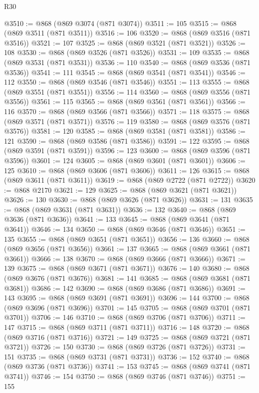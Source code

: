 \begin{lexlean}{R30}
\begin{coremodule}
@3510 := @868 (@869 @3074 (@871 @3074))
@3511 := 105
@3515 := @868 (@869 @3511 (@871 @3511))
@3516 := 106
@3520 := @868 (@869 @3516 (@871 @3516))
@3521 := 107
@3525 := @868 (@869 @3521 (@871 @3521))
@3526 := 108
@3530 := @868 (@869 @3526 (@871 @3526))
@3531 := 109
@3535 := @868 (@869 @3531 (@871 @3531))
@3536 := 110
@3540 := @868 (@869 @3536 (@871 @3536))
@3541 := 111
@3545 := @868 (@869 @3541 (@871 @3541))
@3546 := 112
@3550 := @868 (@869 @3546 (@871 @3546))
@3551 := 113
@3555 := @868 (@869 @3551 (@871 @3551))
@3556 := 114
@3560 := @868 (@869 @3556 (@871 @3556))
@3561 := 115
@3565 := @868 (@869 @3561 (@871 @3561))
@3566 := 116
@3570 := @868 (@869 @3566 (@871 @3566))
@3571 := 118
@3575 := @868 (@869 @3571 (@871 @3571))
@3576 := 119
@3580 := @868 (@869 @3576 (@871 @3576))
@3581 := 120
@3585 := @868 (@869 @3581 (@871 @3581))
@3586 := 121
@3590 := @868 (@869 @3586 (@871 @3586))
@3591 := 122
@3595 := @868 (@869 @3591 (@871 @3591))
@3596 := 123
@3600 := @868 (@869 @3596 (@871 @3596))
@3601 := 124
@3605 := @868 (@869 @3601 (@871 @3601))
@3606 := 125
@3610 := @868 (@869 @3606 (@871 @3606))
@3611 := 126
@3615 := @868 (@869 @3611 (@871 @3611))
@3619 := @868 (@869 @2722 (@871 @2722))
@3620 := @868 @2170
@3621 := 129
@3625 := @868 (@869 @3621 (@871 @3621))
@3626 := 130
@3630 := @868 (@869 @3626 (@871 @3626))
@3631 := 131
@3635 := @868 (@869 @3631 (@871 @3631))
@3636 := 132
@3640 := @868 (@869 @3636 (@871 @3636))
@3641 := 133
@3645 := @868 (@869 @3641 (@871 @3641))
@3646 := 134
@3650 := @868 (@869 @3646 (@871 @3646))
@3651 := 135
@3655 := @868 (@869 @3651 (@871 @3651))
@3656 := 136
@3660 := @868 (@869 @3656 (@871 @3656))
@3661 := 137
@3665 := @868 (@869 @3661 (@871 @3661))
@3666 := 138
@3670 := @868 (@869 @3666 (@871 @3666))
@3671 := 139
@3675 := @868 (@869 @3671 (@871 @3671))
@3676 := 140
@3680 := @868 (@869 @3676 (@871 @3676))
@3681 := 141
@3685 := @868 (@869 @3681 (@871 @3681))
@3686 := 142
@3690 := @868 (@869 @3686 (@871 @3686))
@3691 := 143
@3695 := @868 (@869 @3691 (@871 @3691))
@3696 := 144
@3700 := @868 (@869 @3696 (@871 @3696))
@3701 := 145
@3705 := @868 (@869 @3701 (@871 @3701))
@3706 := 146
@3710 := @868 (@869 @3706 (@871 @3706))
@3711 := 147
@3715 := @868 (@869 @3711 (@871 @3711))
@3716 := 148
@3720 := @868 (@869 @3716 (@871 @3716))
@3721 := 149
@3725 := @868 (@869 @3721 (@871 @3721))
@3726 := 150
@3730 := @868 (@869 @3726 (@871 @3726))
@3731 := 151
@3735 := @868 (@869 @3731 (@871 @3731))
@3736 := 152
@3740 := @868 (@869 @3736 (@871 @3736))
@3741 := 153
@3745 := @868 (@869 @3741 (@871 @3741))
@3746 := 154
@3750 := @868 (@869 @3746 (@871 @3746))
@3751 := 155

\end{coremodule}
\end{lexlean}
